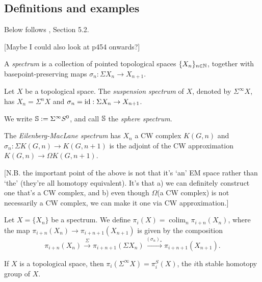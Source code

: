 \documentclass{MetricNotes2023}
\def\bb{\ensuremath\mathbb}
\def\nat{\ensuremath\mathbb{N}}
\def\id{\ensuremath\text{id}}
\DeclareMathOperator{\colim}{colim}
\begin{document}
\subsection{Definitions and examples}

Below follows \autocite{hatcher5}, Section 
5.2.

[Maybe I could also look at \autocite{hatcher} p454 onwards?]

\begin{definition}
A \textit{spectrum} is a collection of pointed topological spaces \(\{X_n\}_{n\in \nat}\), together with basepoint-preserving maps \(\sigma_n : \Sigma X_n \to X_{n+1}\).
\end{definition}

\begin{example}
Let \(X\) be a topological space. The \textit{suspension spectrum} of \(X\), denoted by \(\Sigma^\infty X\), has \(X_n=\Sigma^nX\) and \(\sigma_n=\id : \Sigma X_n \to X_{n+1}\).
\end{example}

We write \(\bb{S}:=\Sigma^\infty S^0\), and call \(\bb{S}\) the \textit{sphere spectrum}. 

\begin{example}
The \textit{Eilenberg-MacLane spectrum} has \(X_n\) a CW complex \(K(G,n)\) and \(\sigma_n : \Sigma K(G,n)\to K(G,n+1)\) is the adjoint of the CW approximation \(K(G, n)\to \Omega K(G,n+1)\).
\end{example}

[N.B. the important point of the above is not that it's `an' EM space rather than `the' (they're all homotopy equivalent). It's that a) we can definitely construct one that's a CW complex, and b) even though \(\Omega\)(a CW complex) is not necessarily a CW complex, we can make it one via CW approximation.]

\begin{definition}
Let \(X=\{X_n\}\) be a spectrum. We define \(\pi_i(X)=\colim_n \pi_{i+n}(X_n)\), where the map \(\pi_{i+n}(X_n)\to \pi_{i+n+1}(X_{n+1})\) is given by the composition
\[\pi_{i+n}(X_n)\xrightarrow{\Sigma}\pi_{i+n+1}(\Sigma X_n)\xrightarrow{(\sigma_n)_*}\pi_{i+n+1}(X_{n+1}).\]
\end{definition}

\begin{example}
If \(X\) is a topological space, then \(\pi_i(\Sigma^\infty X)=\pi_i^S(X)\), the \(i\)th stable homotopy group of \(X\). 
\end{example}
\end{document}
